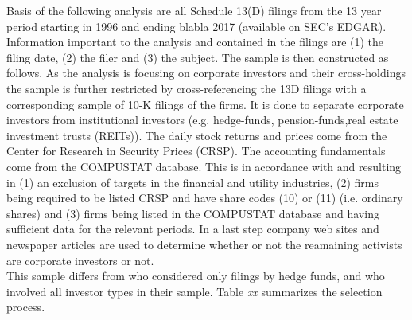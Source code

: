 \documentclass[12pt]{article}
\begin{document}
Basis of the following analysis are all Schedule 13(D) filings from the 13 year period starting in 1996 and ending blabla 2017 (available on SEC's EDGAR).
Information important to the analysis and contained in the filings are (1) the filing date, (2) the filer and (3) the subject. The sample is then constructed as follows. As the analysis is focusing on corporate investors and their cross-holdings the sample is further restricted by cross-referencing the 13D filings with a corresponding sample of 10-K filings of the firms. It is done to separate corporate investors from institutional investors (e.g. hedge-funds, pension-funds,real estate investment trusts (REITs)). 
The daily stock returns and prices come from the Center for Research in Security Prices (CRSP). The accounting fundamentals come from the COMPUSTAT database. This is in accordance with \citet{Fama2006} and \citet{Brigida2012} resulting in (1) an exclusion of targets in the financial and utility industries, (2) firms being required to be listed CRSP and have share codes (10) or (11) (i.e. ordinary shares) and (3)  firms being listed in the COMPUSTAT database and having sufficient data for the relevant periods. In a last step company web sites and newspaper articles are used to determine whether or not the reamaining activists are corporate investors or not.\\
This sample differs from \citet{Brav2008} who considered only filings by hedge funds, and \citet{Collin-Dufresne2015} who involved all investor types in their sample. Table \emph{xx} summarizes the selection process. %
\end{document}
